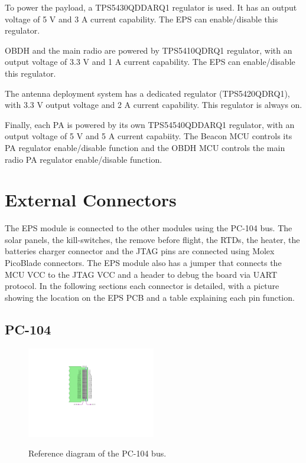 To power the payload, a TPS5430QDDARQ1 regulator is used. It has an output voltage of 5 V and 3 A current capability. The EPS can enable/disable this regulator.

OBDH and the main radio are powered by TPS5410QDRQ1 regulator, with an output voltage of 3.3 V and 1 A current capability. The EPS can enable/disable this regulator.

The antenna deployment system has a dedicated regulator (TPS5420QDRQ1), with 3.3 V output voltage and 2 A current capability. This regulator is always on.

Finally, each PA is powered by its own TPS54540QDDARQ1 regulator, with an output voltage of 5 V and 5 A current capabiity. The Beacon MCU controls its PA regulator enable/disable function and the OBDH MCU controls the main radio PA regulator enable/disable function.

\section{External Connectors}

The EPS module is connected to the other modules using the PC-104 bus. The solar panels, the kill-switches, the remove before flight, the RTDs, the heater, the batteries charger connector and the JTAG pins are connected using Molex PicoBlade connectors. The EPS module also has a jumper that connects the MCU VCC to the JTAG VCC and a header to debug the board via UART protocol. In the following sections each connector is detailed, with a picture showing the location on the EPS PCB and a table explaining each pin function.

\subsection{PC-104}

\begin{figure}[!ht]
    \begin{center}
        \includegraphics[width=0.5\textwidth]{figures/pc104-diagram}
        \label{fig:pc104-diagram}
        \caption{Reference diagram of the PC-104 bus.}
    \end{center}
\end{figure}

